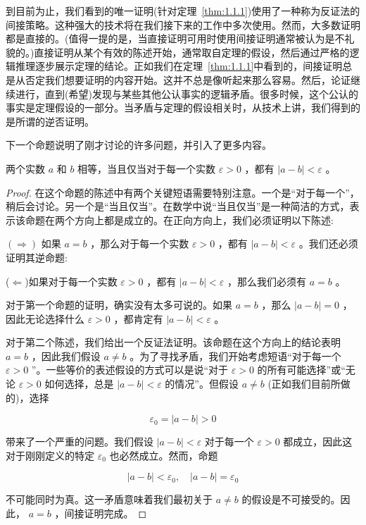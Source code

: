 到目前为止，我们看到的唯一证明(针对定理~\ref{thm:1.1.1})使用了一种称为反证法的间接策略。这种强大的技术将在我们接下来的工作中多次使用。然而，大多数证明都是直接的。(值得一提的是，当直接证明可用时使用间接证明通常被认为是不礼貌的。)直接证明从某个有效的陈述开始，通常取自定理的假设，然后通过严格的逻辑推理逐步展示定理的结论。正如我们在定理~\ref{thm:1.1.1}中看到的，间接证明总是从否定我们想要证明的内容开始。这并不总是像听起来那么容易。然后，论证继续进行，直到(希望)发现与某些其他公认事实的逻辑矛盾。很多时候，这个公认的事实是定理假设的一部分。当矛盾与定理的假设相关时，从技术上讲，我们得到的是所谓的逆否证明。

下一个命题说明了刚才讨论的许多问题，并引入了更多内容。
\begin{Thm}
  \label{thm:1.2.6}
两个实数 \(a\) 和 \(b\) 相等，当且仅当对于每一个实数 \(\varepsilon  > 0\) ，都有 \(\left| {a - b}\right|  < \varepsilon\) 。  
\end{Thm}

\begin{proof}
在这个命题的陈述中有两个关键短语需要特别注意。一个是“对于每一个”，稍后会讨论。另一个是“当且仅当”。在数学中说“当且仅当”是一种简洁的方式，表示该命题在两个方向上都是成立的。在正向方向上，我们必须证明以下陈述:

\(\left(  \Rightarrow  \right)\) 如果 \(a = b\) ，那么对于每一个实数 \(\varepsilon  > 0\) ，都有 \(\left| {a - b}\right|  < \varepsilon\) 。我们还必须证明其逆命题:

($\Leftarrow$)如果对于每一个实数 \(\varepsilon  > 0\) ，都有 \(\left| {a - b}\right|  < \varepsilon\) ，那么我们必须有 \(a = b\) 。

对于第一个命题的证明，确实没有太多可说的。如果 \(a = b\) ，那么 \(\left| {a - b}\right|  = 0\) ，因此无论选择什么 \(\varepsilon  > 0\) ，都肯定有 \(\left| {a - b}\right|  < \varepsilon\) 。

对于第二个陈述，我们给出一个反证法证明。该命题在这个方向上的结论表明 \(a = b\) ，因此我们假设 \(a \neq  b\) 。为了寻找矛盾，我们开始考虑短语“对于每一个 \(\varepsilon  > 0\) ”。一些等价的表述假设的方式可以是说“对于 \(\varepsilon  > 0\) 的所有可能选择”或“无论 \(\varepsilon  > 0\) 如何选择，总是 \(\left| {a - b}\right|  < \varepsilon\) 的情况”。但假设 \(a \neq  b\) (正如我们目前所做的)，选择

\[
{\varepsilon }_{0} = \left| {a - b}\right|  > 0
\]

带来了一个严重的问题。我们假设 \(\left| {a - b}\right|  < \varepsilon\) 对于每一个 \(\varepsilon  > 0\) 都成立，因此这对于刚刚定义的特定 \({\varepsilon }_{0}\) 也必然成立。然而，命题

\[
\left| {a - b}\right|  < {\varepsilon }_{0}, \quad\left| {a - b}\right|  = {\varepsilon }_{0}
\]

不可能同时为真。这一矛盾意味着我们最初关于 \(a \neq  b\) 的假设是不可接受的。因此， \(a = b\) ，间接证明完成。
\end{proof}

